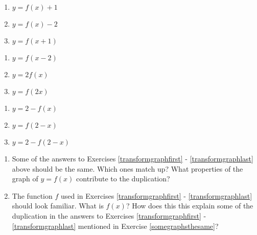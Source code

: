 \begin{multicols}{3}
\begin{enumerate}
\setcounter{enumi}{\value{HW}}

\item $y = f(x) + 1$ \label{transformgraphfirst}
\item $y = f(x) - 2$
\item $y = f(x+1)$

\setcounter{HW}{\value{enumi}}
\end{enumerate}
\end{multicols}

\begin{multicols}{3}
\begin{enumerate}
\setcounter{enumi}{\value{HW}}

\item $y = f(x - 2)$
\item $y = 2f(x)$
\item $y = f(2x)$

\setcounter{HW}{\value{enumi}}
\end{enumerate}
\end{multicols}

\begin{multicols}{3}
\begin{enumerate}
\setcounter{enumi}{\value{HW}}

\item $y = 2 - f(x)$
\item $y = f(2-x)$
\item $y = 2-f(2-x)$ \label{transformgraphlast}

\setcounter{HW}{\value{enumi}}
\end{enumerate}
\end{multicols}


\begin{enumerate}
\setcounter{enumi}{\value{HW}}

\item \label{somegraphsthesame} Some of the answers to Exercises \ref{transformgraphfirst} - \ref{transformgraphlast} above should be the same.  Which ones match up?  What properties of the graph of $y=f(x)$ contribute to the duplication?

\item  The function $f$ used in  Exercises \ref{transformgraphfirst} - \ref{transformgraphlast} should look familiar.  What is $f(x)$?  How does this this explain some of the duplication in the answers to Exercises \ref{transformgraphfirst} - \ref{transformgraphlast} mentioned in Exercise \ref{somegraphsthesame}?

\setcounter{HW}{\value{enumi}}
\end{enumerate}


